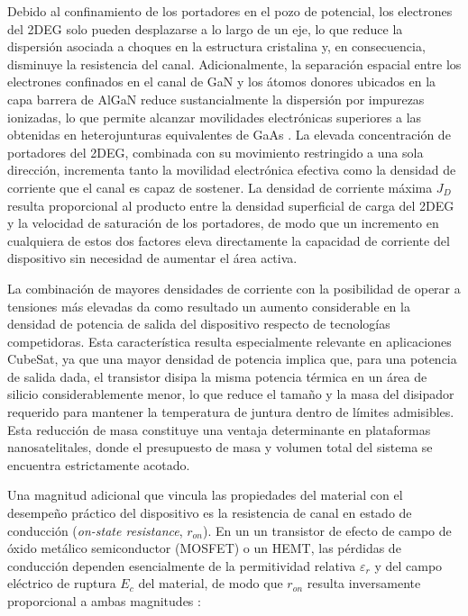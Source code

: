 Debido al confinamiento de los portadores en el pozo de potencial, los electrones del 2DEG solo pueden desplazarse a lo largo de un eje, lo que reduce la dispersión asociada a choques en la estructura cristalina y, en consecuencia, disminuye la resistencia del canal. Adicionalmente, la separación espacial entre los electrones confinados en el canal de GaN y los átomos donores ubicados en la capa barrera de AlGaN reduce sustancialmente la dispersión por impurezas ionizadas, lo que permite alcanzar movilidades electrónicas superiores a las obtenidas en heterojunturas equivalentes de GaAs \cite{Mishra2008}. La elevada concentración de portadores del 2DEG, combinada con su movimiento restringido a una sola dirección, incrementa tanto la movilidad electrónica efectiva como la densidad de corriente que el canal es capaz de sostener. La densidad de corriente máxima $J_{D}$ resulta proporcional al producto entre la densidad superficial de carga del 2DEG y la velocidad de saturación de los portadores, de modo que un incremento en cualquiera de estos dos factores eleva directamente la capacidad de corriente del dispositivo sin necesidad de aumentar el área activa.

La combinación de mayores densidades de corriente con la posibilidad de operar a tensiones más elevadas da como resultado un aumento considerable en la densidad de potencia de salida del dispositivo respecto de tecnologías competidoras. Esta característica resulta especialmente relevante en aplicaciones CubeSat, ya que una mayor densidad de potencia implica que, para una potencia de salida dada, el transistor disipa la misma potencia térmica en un área de silicio considerablemente menor, lo que reduce el tamaño y la masa del disipador requerido para mantener la temperatura de juntura dentro de límites admisibles. Esta reducción de masa constituye una ventaja determinante en plataformas nanosatelitales, donde el presupuesto de masa y volumen total del sistema se encuentra estrictamente acotado.

Una magnitud adicional que vincula las propiedades del material con el desempeño práctico del dispositivo es la resistencia de canal en estado de conducción (\textit{on-state resistance}, $r_{on}$). En un un transistor de efecto de campo de óxido metálico semiconductor (MOSFET) o un HEMT, las pérdidas de conducción dependen esencialmente de la permitividad relativa $\varepsilon_r$ y del campo eléctrico de ruptura $E_c$ del material, de modo que $r_{on}$ resulta inversamente proporcional a ambas magnitudes \cite{Deblecker2015}:

